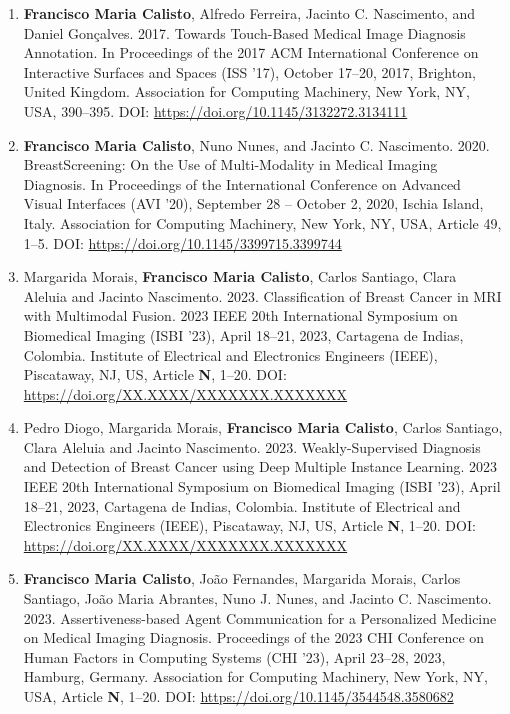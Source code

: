 \begin{enumerate}
\item {\bf Francisco Maria Calisto}, Alfredo Ferreira, Jacinto C. Nascimento, and Daniel Gonçalves. 2017. Towards Touch-Based Medical Image Diagnosis Annotation. In Proceedings of the 2017 ACM International Conference on Interactive Surfaces and Spaces (ISS '17), October 17--20, 2017, Brighton, United Kingdom. Association for Computing Machinery, New York, NY, USA, 390–395. DOI: \href{https://doi.org/10.1145/3132272.3134111}{https://doi.org/10.1145/3132272.3134111}
\item {\bf Francisco Maria Calisto}, Nuno Nunes, and Jacinto C. Nascimento. 2020. BreastScreening: On the Use of Multi-Modality in Medical Imaging Diagnosis. In Proceedings of the International Conference on Advanced Visual Interfaces (AVI '20), September 28 -- October 2, 2020, Ischia Island, Italy. Association for Computing Machinery, New York, NY, USA, Article 49, 1–5. DOI: \href{https://doi.org/10.1145/3399715.3399744}{https://doi.org/10.1145/3399715.3399744}
\item Margarida Morais, {\bf Francisco Maria Calisto}, Carlos Santiago, Clara Aleluia and Jacinto Nascimento. 2023. Classification of Breast Cancer in MRI with Multimodal Fusion. 2023 IEEE 20th International Symposium on Biomedical Imaging (ISBI '23), April 18--21, 2023, Cartagena de Indias, Colombia. Institute of Electrical and Electronics Engineers (IEEE), Piscataway, NJ, US, Article {\bf N}, 1–20. DOI: \href{https://doi.org/XX.XXXX/XXXXXXX.XXXXXXX}{https://doi.org/XX.XXXX/XXXXXXX.XXXXXXX}
\item Pedro Diogo, Margarida Morais, {\bf Francisco Maria Calisto}, Carlos Santiago, Clara Aleluia and Jacinto Nascimento. 2023. Weakly-Supervised Diagnosis and Detection of Breast Cancer using Deep Multiple Instance Learning. 2023 IEEE 20th International Symposium on Biomedical Imaging (ISBI '23), April 18--21, 2023, Cartagena de Indias, Colombia. Institute of Electrical and Electronics Engineers (IEEE), Piscataway, NJ, US, Article {\bf N}, 1–20. DOI: \href{https://doi.org/XX.XXXX/XXXXXXX.XXXXXXX}{https://doi.org/XX.XXXX/XXXXXXX.XXXXXXX}
\item {\bf Francisco Maria Calisto}, Jo\~{a}o Fernandes, Margarida Morais, Carlos Santiago, Jo\~{a}o Maria Abrantes, Nuno J. Nunes, and Jacinto C. Nascimento. 2023. Assertiveness-based Agent Communication for a Personalized Medicine on Medical Imaging Diagnosis. Proceedings of the 2023 CHI Conference on Human Factors in Computing Systems (CHI '23), April 23--28, 2023, Hamburg, Germany. Association for Computing Machinery, New York, NY, USA, Article {\bf N}, 1–20. DOI: \href{https://doi.org/10.1145/3544548.3580682}{https://doi.org/10.1145/3544548.3580682}
\end{enumerate}

